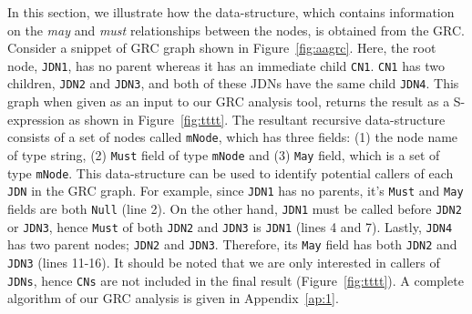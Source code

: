 In this section, we illustrate how the data-structure, which contains
information on the \textit{may} and \textit{must} relationships between
the nodes, is obtained from the GRC. Consider a snippet of GRC graph
shown in Figure~\ref{fig:aagrc}. Here, the root node, \texttt{JDN1}, has
no parent whereas it has an immediate child \texttt{CN1}. \texttt{CN1}
has two children, \texttt{JDN2} and \texttt{JDN3}, and both of these
JDNs have the same child \texttt{JDN4}. This graph when given as an
input to our GRC analysis tool, returns the result as a S-expression as
shown in Figure~\ref{fig:tttt}. The resultant recursive data-structure
consists of a set of nodes called \texttt{mNode}, which has three
fields: (1) the node name of type string, (2) \texttt{Must} field of
type \texttt{mNode} and (3) \texttt{May} field, which is a set of type
\texttt{mNode}. This data-structure can be used to identify potential
callers of each \texttt{JDN} in the GRC graph. For example, since
\texttt{JDN1} has no parents, it's \texttt{Must} and \texttt{May} fields
are both \texttt{Null} (line 2).  On the other hand, \texttt{JDN1} must
be called before \texttt{JDN2} or \texttt{JDN3}, hence \texttt{Must} of
both \texttt{JDN2} and \texttt{JDN3} is \texttt{JDN1} (lines 4 and 7).
Lastly, \texttt{JDN4} has two parent nodes; \texttt{JDN2} and
\texttt{JDN3}. Therefore, its \texttt{May} field has both \texttt{JDN2}
and \texttt{JDN3} (lines 11-16). It should be noted that we are only
interested in callers of \texttt{JDNs}, hence \texttt{CNs} are not
included in the final result (Figure~\ref{fig:tttt}). A complete
algorithm of our GRC analysis is given in Appendix~\ref{ap:1}.






